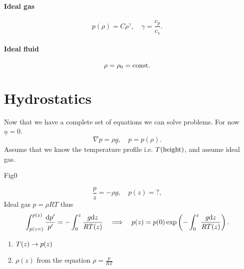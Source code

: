 \documentclass[11pt,oneside]{book}
\renewcommand{\vec}[1]{\underline{#1}}
\theoremstyle{definition} %
\theoremstyle{plain} %
\theoremstyle{remark} %
\theoremstyle{underline}
\begin{document}
  \paragraph{Ideal gas}
  \begin{displaymath}
    p(\rho) = C \rho ^\gamma, \quad \gamma = \frac{c_p}{c_v}.
  \end{displaymath}

  \paragraph{Ideal fluid}
  \begin{displaymath}
    \rho = \rho_0 = \textrm{const}.
  \end{displaymath}

  \section{Hydrostatics}
  Now that we have a complete set of equations we can solve problems.
  For now $\vec u = 0$.
  \begin{displaymath}
    \nabla p = \rho \vec g, \quad p = p(\rho).
  \end{displaymath}
  Assume that we know the temperature profile i.e. $T(\textrm{height})$, and assume ideal gas.
  
  \todo Fig0

  
  \begin{displaymath}
    \dfrac{p}{z} = - \rho g, \quad p(z) = ?,
  \end{displaymath}
  Ideal gas $p = \rho R T$ thus 
  \begin{displaymath}
    \int_{p(z = )}^{p(z)} \frac{\mathrm{d} p'}{p'} = - \int_0^z \frac{g \mathrm{d} z}{RT(z)} 
    \quad \Longrightarrow \quad p(z) = p(0) \exp\left( -\int_0^z \frac{g \mathrm{d} z}{RT(z)} \right).
  \end{displaymath}

  \begin{enumerate}
    \item $T(z) \rightarrow p(z)$
    \item $\rho(z)$ from the equation $\rho=  \frac{p}{RT}$
  \end{enumerate}
\end{document}
